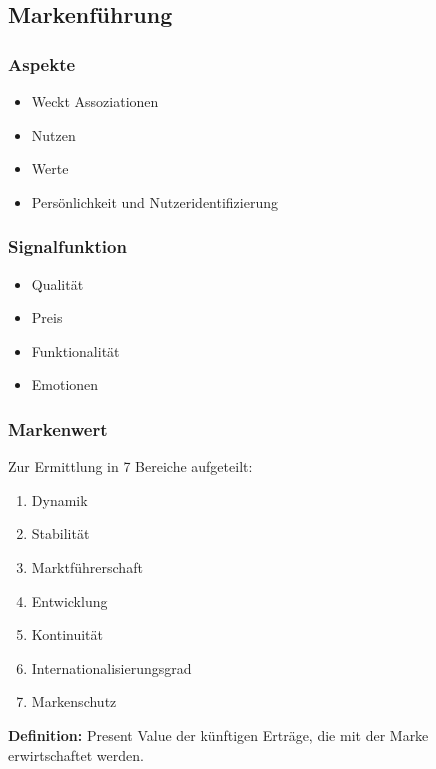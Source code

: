 \documentclass[../ZF_Wing.tex]{subfiles}
\begin{document}
\subsection{Markenführung}


\subsubsection{Aspekte}
\begin{itemize}
	\item Weckt Assoziationen
	\item Nutzen
	\item Werte
	\item Persönlichkeit und Nutzeridentifizierung
\end{itemize}



\subsubsection{Signalfunktion}

\begin{itemize}
	\item Qualität
	\item Preis
	\item Funktionalität
	\item Emotionen
\end{itemize}



\subsubsection{Markenwert}

Zur Ermittlung in 7 Bereiche aufgeteilt: \\

\begin{enumerate}
	\item Dynamik
	\item Stabilität
	\item Marktführerschaft
	\item Entwicklung
	\item Kontinuität
	\item Internationalisierungsgrad
	\item Markenschutz
\end{enumerate}

\textbf{Definition: } Present Value der künftigen Erträge, die mit der Marke erwirtschaftet werden.\\
\end{document}
